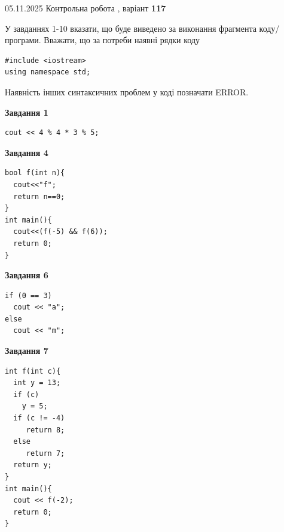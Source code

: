 \documentclass[12pt, ukrainian]{article}
\begin{document}
\newpage

{\Large{05.11.2025 Контрольна робота , варіант  \No \textbf { 117 }\par}}
{
\begin {large}
У завданнях 1-10 вказати, що буде виведено за виконання фрагмента коду/про\-гра\-ми.
Вважати, що за потреби наявні рядки коду
\begin{verbatim}
#include <iostream>
using namespace std;
\end{verbatim}
Наявність інших синтаксичних проблем у коді позначати ERROR.

\begin{minipage}[t]{7.0cm}

\begin{center}
\textbf{Завдання 1}
\end{center}
\vspace{-8mm}

\begin{verbatim}
cout << 4 % 4 * 3 % 5;
\end{verbatim}



\begin{center}
\textbf{Завдання 4}
\end{center}
\vspace{-8mm}

\begin{verbatim}
bool f(int n){
  cout<<"f";
  return n==0;
}
int main(){
  cout<<(f(-5) && f(6));
  return 0;
}
\end{verbatim}



\begin{center}
\textbf{Завдання 6}
\end{center}
\vspace{-8mm}

\begin{verbatim}
if (0 == 3)
  cout << "a";
else
  cout << "m";
\end{verbatim}



\begin{center}
\textbf{Завдання 7}
\end{center}
\vspace{-8mm}

\begin{verbatim}
int f(int c){
  int y = 13;
  if (c)
    y = 5;
  if (c != -4)
     return 8;
  else
     return 7;
  return y;
}
int main(){
  cout << f(-2);
  return 0;
}
\end{verbatim}


\end{minipage}
\end{large}}
\end{document}
